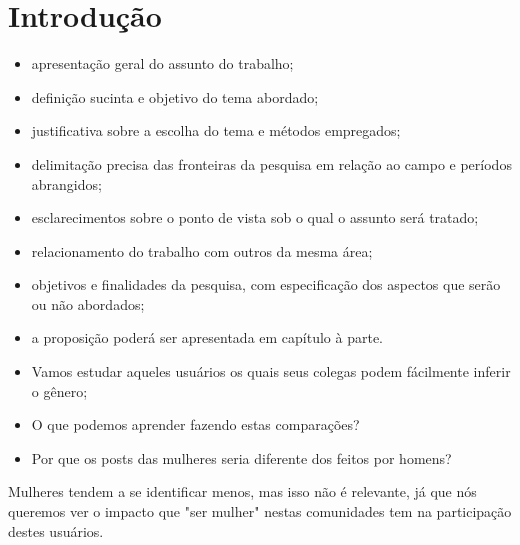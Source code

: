 \chapter{Introdu\c{c}\~{a}o}

\begin{itemize}
\item apresentação geral do assunto do trabalho;
\item definição sucinta e objetivo do tema abordado;
\item justificativa sobre a escolha do tema e métodos empregados;
\item delimitação precisa das fronteiras da pesquisa em relação ao campo e períodos abrangidos;
\item esclarecimentos sobre o ponto de vista sob o qual o assunto será tratado;
\item relacionamento do trabalho com outros da mesma área;
\item objetivos e finalidades da pesquisa, com especificação dos aspectos que serão ou não abordados;
\item a proposição poderá ser apresentada em capítulo à parte. 
\end{itemize}

\begin{itemize}
\item Vamos estudar aqueles usuários os quais seus colegas podem fácilmente inferir o gênero;
\item O que podemos aprender fazendo estas comparações?
\item Por que os posts das mulheres seria diferente dos feitos por homens?

\end{itemize}

Mulheres tendem a se identificar menos, mas isso não é relevante, já que nós queremos ver o impacto que "ser mulher" nestas comunidades tem na participação destes usuários.